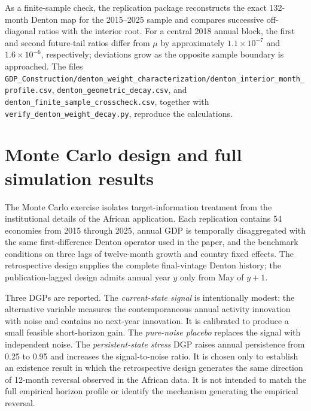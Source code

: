 \documentclass[preprint,12pt,authoryear]{elsarticle}
\begin{document}
As a finite-sample check, the replication package reconstructs the exact 132-month Denton map for the 2015--2025 sample and compares successive off-diagonal ratios with the interior root. For a central 2018 annual block, the first and second future-tail ratios differ from $\mu$ by approximately $1.1\times10^{-7}$ and $1.6\times10^{-6}$, respectively; deviations grow as the opposite sample boundary is approached. The files \nolinkurl{GDP_Construction/denton_weight_characterization/denton_interior_month_profile.csv}, \nolinkurl{denton_geometric_decay.csv}, and \nolinkurl{denton_finite_sample_crosscheck.csv}, together with \nolinkurl{verify_denton_weight_decay.py}, reproduce the calculations.

\section{Monte Carlo design and full simulation results}
The Monte Carlo exercise isolates target-information treatment from the institutional details of the African application. Each replication contains 54 economies from 2015 through 2025, annual GDP is temporally disaggregated with the same first-difference Denton operator used in the paper, and the benchmark conditions on three lags of twelve-month growth and country fixed effects. The retrospective design supplies the complete final-vintage Denton history; the publication-lagged design admits annual year $y$ only from May of $y+1$.

Three DGPs are reported. The \emph{current-state signal} is intentionally modest: the alternative variable measures the contemporaneous annual activity innovation with noise and contains no next-year innovation. It is calibrated to produce a small feasible short-horizon gain. The \emph{pure-noise placebo} replaces the signal with independent noise. The \emph{persistent-state stress} DGP raises annual persistence from 0.25 to 0.95 and increases the signal-to-noise ratio. It is chosen only to establish an existence result in which the retrospective design generates the same direction of 12-month reversal observed in the African data. It is not intended to match the full empirical horizon profile or identify the mechanism generating the empirical reversal.
\end{document}
